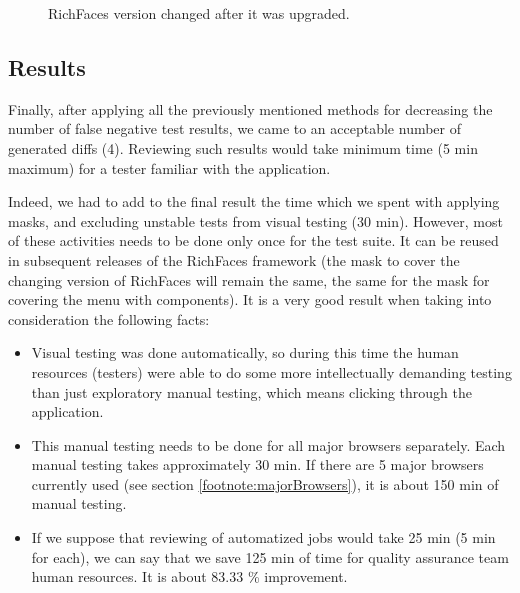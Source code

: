 \documentclass[11pt,oneside,final]{fithesis2}
\begin{document}
  \begin{figure}[h!]
      \begin{center}
      \leavevmode
      \centerline{}
      \end{center}
      \caption{RichFaces version changed after it was upgraded.}
      \label{fig:rfVersionChanged}
  \end{figure}
  
  \subsection{Results}
  
  Finally, after applying all the previously mentioned methods for decreasing the number of false negative test results, we came to an acceptable
  number of generated diffs (4). Reviewing such results would take minimum time (5 min maximum) for a tester familiar with the application.
  
  Indeed, we had to add to the final result the time which we spent with applying masks, and excluding unstable tests from visual
  testing (30 min). However, most of these activities needs to be done only once for the test suite. It can be reused in subsequent
  releases of the RichFaces framework (the mask to cover the changing version of RichFaces will remain the same, the same for the mask for covering
  the menu with components).
  \newpage
  It is a very good result when taking into consideration the following facts:
  
  \begin{itemize}
   \item Visual testing was done automatically, so during this time the human resources (testers) were able to do some more 
   intellectually demanding testing than just exploratory manual testing, which means clicking through the application.
   \item This manual testing needs to be done for all major browsers separately. Each manual testing takes approximately 30 min.
         If there are 5 major browsers currently used (see section \ref{footnote:majorBrowsers}), it is about 150 min of manual testing.
   \item If we suppose that reviewing of automatized jobs would take 25 min (5 min for each), we can say that we save
	 125 min of time for quality assurance team human resources. It is about 83.33 \% improvement.
  \end{itemize}
\end{document}
